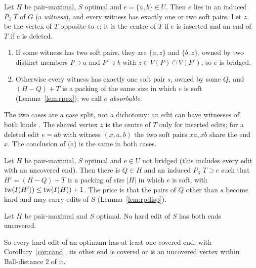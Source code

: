 \begin{lemma}\label{lem:rpwit}
Let $H$ be pair-maximal, $S$ optimal and $e=\{a,b\}\in U$. Then $e$ lies in an induced $P_3$ $T$ of $G$ (a \emph{witness}), and every witness has exactly one or two soft pairs. Let $z$ be the vertex of $T$ opposite to $e$; it is the centre of $T$ if $e$ is inserted and an end of $T$ if $e$ is deleted.
\begin{enumerate}
\item[(a)] If some witness has two soft pairs, they are $\{a,z\}$ and $\{b,z\}$, owned by two distinct members $P\ni a$ and $P'\ni b$ with $z\in V(P)\cap V(P')$; so $e$ is bridged.
\item[(b)] Otherwise every witness has exactly one soft pair $s$, owned by some $Q$, and $(H-Q)+T$ is a packing of the same size in which $e$ is soft (Lemma~\ref{lem:rpex}); we call $e$ \emph{absorbable}.
\end{enumerate}
\end{lemma}
The two cases are a case split, not a dichotomy: an edit can have witnesses of both kinds . The shared vertex $z$ is the centre of $T$ only for inserted edits; for a deleted edit $e=ab$ with witness $(x,a,b)$ the two soft pairs $xa,xb$ share the end $x$. The conclusion of (a) is the same in both cases.

\begin{corollary}\label{cor:rpabs}
Let $H$ be pair-maximal, $S$ optimal and $e\in U$ not bridged (this includes every edit with an uncovered end). Then there is $Q\in H$ and an induced $P_3$ $T\supset e$ such that $H'=(H-Q)+T$ is a packing of size $|H|$ in which $e$ is soft, with $\mathrm{tw}(I(H'))\le\mathrm{tw}(I(H))+1$. The price is that the pairs of $Q$ other than $s$ become hard and may carry edits of $S$ (Lemma~\ref{lem:rpdisp}).
\end{corollary}

\begin{lemma}\label{lem:rpunc}
Let $H$ be pair-maximal and $S$ optimal. No hard edit of $S$ has both ends uncovered.
\end{lemma}
So every hard edit of an optimum has at least one covered end; with Corollary~\ref{cor:cand}, its other end is covered or is an uncovered vertex within $\mathrm{Ball}$-distance $2$ of it.

